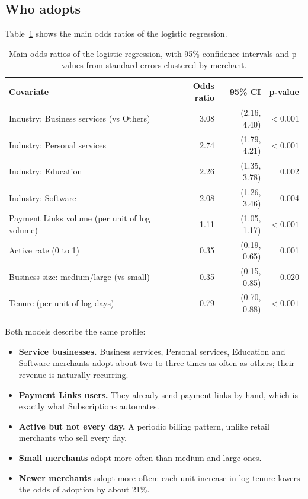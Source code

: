 \documentclass[11pt]{article}
\begin{document}
\subsection{Who adopts}

Table~\ref{tab:odds} shows the main odds ratios of the logistic regression.

\begin{table}[H]
\centering
\caption{Main odds ratios of the logistic regression, with 95\% confidence intervals and p-values from standard errors clustered by merchant.}
\label{tab:odds}
\begin{tabular}{lrrr}
\toprule
Covariate & Odds ratio & 95\% CI & p-value \\
\midrule
Industry: Business services (vs Others) & 3.08 & (2.16, 4.40) & $<0.001$ \\
Industry: Personal services & 2.74 & (1.79, 4.21) & $<0.001$ \\
Industry: Education & 2.26 & (1.35, 3.78) & 0.002 \\
Industry: Software & 2.08 & (1.26, 3.46) & 0.004 \\
Payment Links volume (per unit of log volume) & 1.11 & (1.05, 1.17) & $<0.001$ \\
Active rate (0 to 1) & 0.35 & (0.19, 0.65) & 0.001 \\
Business size: medium/large (vs small) & 0.35 & (0.15, 0.85) & 0.020 \\
Tenure (per unit of log days) & 0.79 & (0.70, 0.88) & $<0.001$ \\
\bottomrule
\end{tabular}
\end{table}

Both models describe the same profile:
\begin{itemize}
  \item \textbf{Service businesses.} Business services, Personal services, Education and Software merchants adopt about two to three times as often as others; their revenue is naturally recurring.
  \item \textbf{Payment Links users.} They already send payment links by hand, which is exactly what Subscriptions automates.
  \item \textbf{Active but not every day.} A periodic billing pattern, unlike retail merchants who sell every day.
  \item \textbf{Small merchants} adopt more often than medium and large ones.
  \item \textbf{Newer merchants} adopt more often: each unit increase in log tenure lowers the odds of adoption by about 21\%.
\end{itemize}
\end{document}
